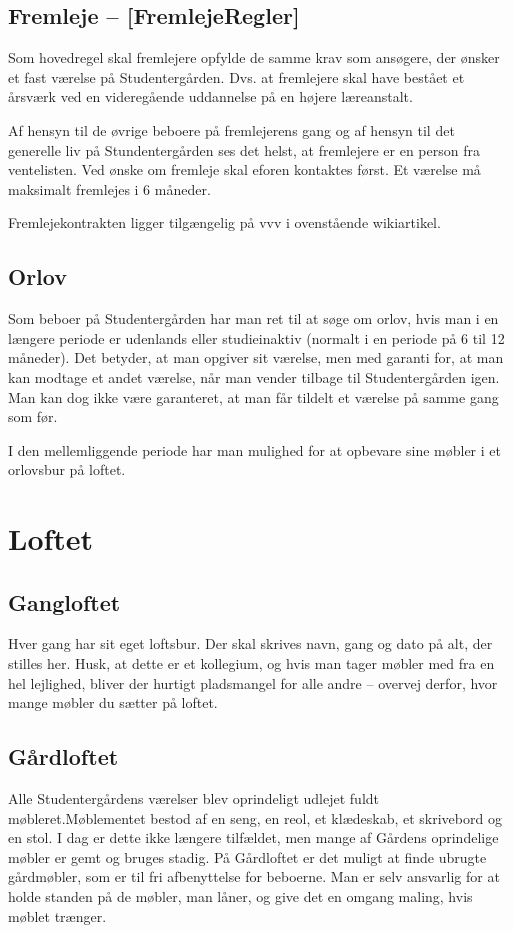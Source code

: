 \documentclass[11pt,article,twoside,openany,danish,extrafontsizes]{memoir} %
\begin{document}
\subsection{Fremleje -- [FremlejeRegler]}
Som hovedregel skal fremlejere opfylde de samme krav som ansøgere, der ønsker et fast værelse på Studentergården. Dvs. at fremlejere skal have bestået et årsværk ved en videregående uddannelse på en højere læreanstalt.

Af hensyn til de øvrige beboere på fremlejerens gang og af hensyn til det generelle liv på Stundentergården ses det helst, at fremlejere er en person fra ventelisten. Ved ønske om fremleje skal eforen kontaktes først. Et værelse må maksimalt fremlejes i 6 måneder.

Fremlejekontrakten ligger tilgængelig på vvv i ovenstående wikiartikel.

\subsection{Orlov}
Som beboer på Studentergården har man ret til at søge om orlov, hvis man i en længere periode er udenlands eller studieinaktiv (normalt i en periode på 6 til 12 måneder). Det betyder, at man opgiver sit værelse, men med garanti for, at man kan modtage et andet værelse, når man vender tilbage til Studentergården igen. Man kan dog ikke være garanteret, at man får tildelt et værelse på samme gang som før.

I den mellemliggende periode har man mulighed for at opbevare sine møbler i et orlovsbur på loftet.


\section{Loftet}

\subsection{Gangloftet}
Hver gang har sit eget loftsbur. Der skal skrives navn, gang og dato på alt, der stilles her. Husk, at dette er et kollegium, og hvis man tager møbler med fra en hel lejlighed, bliver der hurtigt pladsmangel for alle andre -- overvej derfor, hvor mange møbler du sætter på loftet.

\subsection{Gårdloftet}
Alle Studentergårdens værelser blev oprindeligt udlejet fuldt møbleret.\linebreak Møblementet bestod af en seng, en reol, et klædeskab, et skrivebord og en stol. I dag er dette ikke længere tilfældet, men mange af Gårdens oprindelige møbler er gemt og bruges stadig. På Gårdloftet er det muligt at finde ubrugte gårdmøbler, som er til fri afbenyttelse for beboerne. Man er selv ansvarlig for at holde standen på de møbler, man låner, og give det en omgang maling, hvis møblet trænger.
\end{document}
